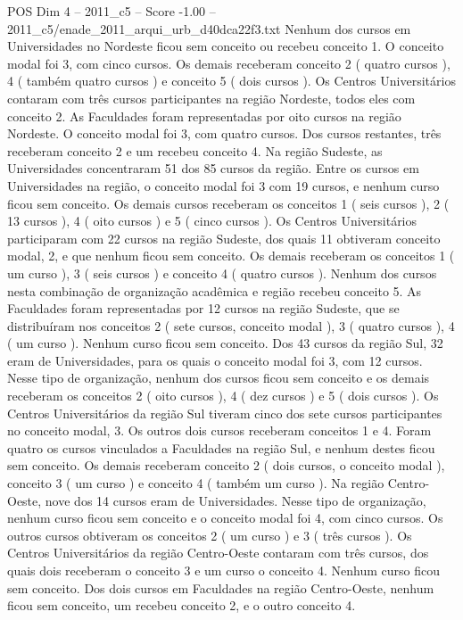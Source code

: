 \begin{textsample}{POS Dim 4 – 2011\_c5 – Score -1.00 – 2011\_c5/enade\_2011\_arqui\_urb\_d40dca22f3.txt}
Nenhum dos cursos em Universidades no Nordeste ficou sem conceito ou recebeu conceito 1.
O conceito modal foi 3, com cinco cursos.
Os demais receberam conceito 2 ( quatro cursos ), 4 ( também quatro cursos ) e conceito 5 ( dois cursos ).
Os Centros Universitários contaram com três cursos participantes na região Nordeste, todos eles com conceito 2.
As Faculdades foram representadas por oito cursos na região Nordeste.
O conceito modal foi 3, com quatro cursos.
Dos cursos restantes, três receberam conceito 2 e um recebeu conceito 4.
Na região Sudeste, as Universidades concentraram 51 dos 85 cursos da região.
Entre os cursos em Universidades na região, o conceito modal foi 3 com 19 cursos, e nenhum curso ficou sem conceito.
Os demais cursos receberam os conceitos 1 ( seis cursos ), 2 ( 13 cursos ), 4 ( oito cursos ) e 5 ( cinco cursos ).
Os Centros Universitários participaram com 22 cursos na região Sudeste, dos quais 11 obtiveram conceito modal, 2, e que nenhum ficou sem conceito.
Os demais receberam os conceitos 1 ( um curso ), 3 ( seis cursos ) e conceito 4 ( quatro cursos ).
Nenhum dos cursos nesta combinação de organização acadêmica e região recebeu conceito 5.
As Faculdades foram representadas por 12 cursos na região Sudeste, que se distribuíram nos conceitos 2 ( sete cursos, conceito modal ), 3 ( quatro cursos ), 4 ( um curso ).
Nenhum curso ficou sem conceito.
Dos 43 cursos da região Sul, 32 eram de Universidades, para os quais o conceito modal foi 3, com 12 cursos.
Nesse tipo de organização, nenhum dos cursos ficou sem conceito e os demais receberam os conceitos 2 ( oito cursos ), 4 ( dez cursos ) e 5 ( dois cursos ).
Os Centros Universitários da região Sul tiveram cinco dos sete cursos participantes no conceito modal, 3.
Os outros dois cursos receberam conceitos 1 e 4.
Foram quatro os cursos vinculados a Faculdades na região Sul, e nenhum destes ficou sem conceito.
Os demais receberam conceito 2 ( dois cursos, o conceito modal ), conceito 3 ( um curso ) e conceito 4 ( também um curso ).
Na região Centro-Oeste, nove dos 14 cursos eram de Universidades.
Nesse tipo de organização, nenhum curso ficou sem conceito e o conceito modal foi 4, com cinco cursos.
Os outros cursos obtiveram os conceitos 2 ( um curso ) e 3 ( três cursos ).
Os Centros Universitários da região Centro-Oeste contaram com três cursos, dos quais dois receberam o conceito 3 e um curso o conceito 4.
Nenhum curso ficou sem conceito.
Dos dois cursos em Faculdades na região Centro-Oeste, nenhum ficou sem conceito, um recebeu conceito 2, e o outro conceito 4.

\end{textsample}
